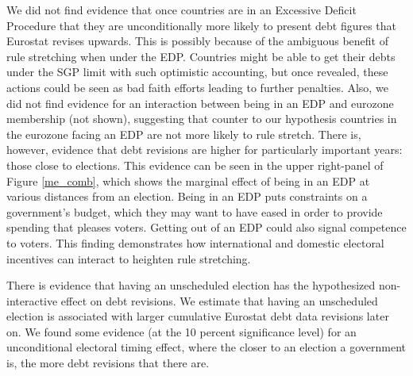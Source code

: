 \documentclass[]{article}
\begin{document}
\begin{landscape}
    
\end{landscape}

We did not find evidence that once countries are in an Excessive Deficit Procedure that they are unconditionally more likely to present debt figures that Eurostat revises upwards. This is possibly because of the ambiguous benefit of rule stretching when under the EDP. Countries might be able to get their debts under the SGP limit with such optimistic accounting, but once revealed, these actions could be seen as bad faith efforts leading to further penalties. Also, we did not find evidence for an interaction between being in an EDP and eurozone membership (not shown), suggesting that counter to our hypothesis countries in the eurozone facing an EDP are not more likely to rule stretch. There is, however, evidence that debt revisions are higher for particularly important years: those close to elections. This evidence can be seen in the upper right-panel of Figure \ref{me_comb}, which shows the marginal effect of being in an EDP at various distances from an election. Being in an EDP puts constraints on a government's budget, which they may want to have eased in order to provide spending that pleases voters. Getting out of an EDP could also signal competence to voters. This finding demonstrates how international and domestic electoral incentives can interact to heighten rule stretching.

There is evidence that having an unscheduled election has the hypothesized non-interactive effect on debt revisions. We estimate that having an unscheduled election is associated with larger cumulative Eurostat debt data revisions later on. We found some evidence (at the 10 percent significance level) for an unconditional electoral timing effect, where the closer to an election a government is, the more debt revisions that there are.
\end{document}
